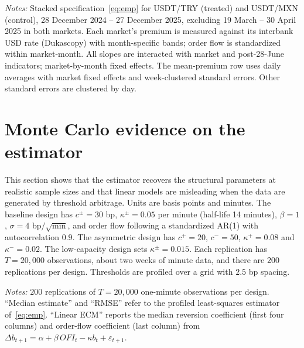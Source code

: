 \documentclass[12pt]{article}
\theoremstyle{definition}
\theoremstyle{remark}
\begin{document}
\begin{table}[t]
\centering
\caption{\textbf{Difference-in-differences against USDT/MXN}}
\label{tab:emp_did}
\footnotesize
\resizebox{\ifdim\width>\textwidth\textwidth\else\width\fi}{!}{}
\begin{minipage}{0.95\textwidth}
\footnotesize\vspace{4pt}
\emph{Notes:} Stacked specification~\eqref{eq:emp} for USDT/TRY (treated) and USDT/MXN (control), 28 December 2024 -- 27 December 2025, excluding 19 March -- 30 April 2025 in both markets. Each market's premium is measured against its interbank USD rate (Dukascopy) with month-specific bands; order flow is standardized within market-month. All slopes are interacted with market and post-28-June indicators; market-by-month fixed effects. The mean-premium row uses daily averages with market fixed effects and week-clustered standard errors. Other standard errors are clustered by day.
\end{minipage}
\end{table}



\section{Monte Carlo evidence on the estimator}\label{sec:mc}

This section shows that the estimator recovers the structural parameters at realistic sample sizes and that linear models are misleading when the data are generated by threshold arbitrage. Units are basis points and minutes. The baseline design has $c^\pm=30$ bp, $\kappa^\pm=0.05$ per minute (half-life 14 minutes), $\beta=1$, $\sigma=4$ bp$/\sqrt{\text{min}}$, and order flow following a standardized AR(1) with autocorrelation $0.9$. The asymmetric design has $c^+=20$, $c^-=50$, $\kappa^+=0.08$ and $\kappa^-=0.02$. The low-capacity design sets $\kappa^\pm=0.015$. Each replication has $T=20{,}000$ observations, about two weeks of minute data, and there are $200$ replications per design. Thresholds are profiled over a grid with $2.5$ bp spacing.

\begin{table}[t]
\centering
\caption{\textbf{Monte Carlo: recovery of structural parameters}}
\label{tab:mc}
\small

\begin{minipage}{0.92\textwidth}
\footnotesize
\vspace{4pt}
\emph{Notes:} $200$ replications of $T=20{,}000$ one-minute observations per design. ``Median estimate'' and ``RMSE'' refer to the profiled least-squares estimator of~\eqref{eq:emp}. ``Linear ECM'' reports the median reversion coefficient (first four columns) and order-flow coefficient (last column) from $\Delta b_{t+1}=\alpha+\beta\,\mathit{OFI}_t-\kappa b_t+\varepsilon_{t+1}$.
\end{minipage}
\end{table}
\end{document}

